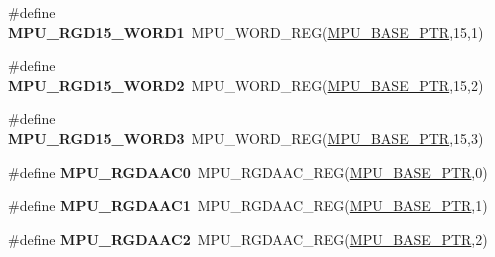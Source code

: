 \begin{DoxyCompactItemize}
\item 
\hypertarget{group___m_p_u___register___accessor___macros_gaebf817ad1eef469cd50e9e0956e2af03}{}\#define {\bfseries M\+P\+U\+\_\+\+R\+G\+D15\+\_\+\+W\+O\+R\+D1}~M\+P\+U\+\_\+\+W\+O\+R\+D\+\_\+\+R\+E\+G(\hyperlink{group___m_p_u___peripheral_gae2d60f80178d84225d77e5f0214d1f1d}{M\+P\+U\+\_\+\+B\+A\+S\+E\+\_\+\+P\+T\+R},15,1)\label{group___m_p_u___register___accessor___macros_gaebf817ad1eef469cd50e9e0956e2af03}

\item 
\hypertarget{group___m_p_u___register___accessor___macros_gaa2120bdb37515bbf0f5db06fda8b4594}{}\#define {\bfseries M\+P\+U\+\_\+\+R\+G\+D15\+\_\+\+W\+O\+R\+D2}~M\+P\+U\+\_\+\+W\+O\+R\+D\+\_\+\+R\+E\+G(\hyperlink{group___m_p_u___peripheral_gae2d60f80178d84225d77e5f0214d1f1d}{M\+P\+U\+\_\+\+B\+A\+S\+E\+\_\+\+P\+T\+R},15,2)\label{group___m_p_u___register___accessor___macros_gaa2120bdb37515bbf0f5db06fda8b4594}

\item 
\hypertarget{group___m_p_u___register___accessor___macros_gab71dbe11b0d5a41e1f0084b4819ee6a1}{}\#define {\bfseries M\+P\+U\+\_\+\+R\+G\+D15\+\_\+\+W\+O\+R\+D3}~M\+P\+U\+\_\+\+W\+O\+R\+D\+\_\+\+R\+E\+G(\hyperlink{group___m_p_u___peripheral_gae2d60f80178d84225d77e5f0214d1f1d}{M\+P\+U\+\_\+\+B\+A\+S\+E\+\_\+\+P\+T\+R},15,3)\label{group___m_p_u___register___accessor___macros_gab71dbe11b0d5a41e1f0084b4819ee6a1}

\item 
\hypertarget{group___m_p_u___register___accessor___macros_ga78b7d95e1492b4eb6b00783e99c814b5}{}\#define {\bfseries M\+P\+U\+\_\+\+R\+G\+D\+A\+A\+C0}~M\+P\+U\+\_\+\+R\+G\+D\+A\+A\+C\+\_\+\+R\+E\+G(\hyperlink{group___m_p_u___peripheral_gae2d60f80178d84225d77e5f0214d1f1d}{M\+P\+U\+\_\+\+B\+A\+S\+E\+\_\+\+P\+T\+R},0)\label{group___m_p_u___register___accessor___macros_ga78b7d95e1492b4eb6b00783e99c814b5}

\item 
\hypertarget{group___m_p_u___register___accessor___macros_gaf5564ef4506a226fa6cca17a9321171c}{}\#define {\bfseries M\+P\+U\+\_\+\+R\+G\+D\+A\+A\+C1}~M\+P\+U\+\_\+\+R\+G\+D\+A\+A\+C\+\_\+\+R\+E\+G(\hyperlink{group___m_p_u___peripheral_gae2d60f80178d84225d77e5f0214d1f1d}{M\+P\+U\+\_\+\+B\+A\+S\+E\+\_\+\+P\+T\+R},1)\label{group___m_p_u___register___accessor___macros_gaf5564ef4506a226fa6cca17a9321171c}

\item 
\hypertarget{group___m_p_u___register___accessor___macros_ga00ab93d39750eff511ce507df05ab40b}{}\#define {\bfseries M\+P\+U\+\_\+\+R\+G\+D\+A\+A\+C2}~M\+P\+U\+\_\+\+R\+G\+D\+A\+A\+C\+\_\+\+R\+E\+G(\hyperlink{group___m_p_u___peripheral_gae2d60f80178d84225d77e5f0214d1f1d}{M\+P\+U\+\_\+\+B\+A\+S\+E\+\_\+\+P\+T\+R},2)\label{group___m_p_u___register___accessor___macros_ga00ab93d39750eff511ce507df05ab40b}


\end{DoxyCompactItemize}
